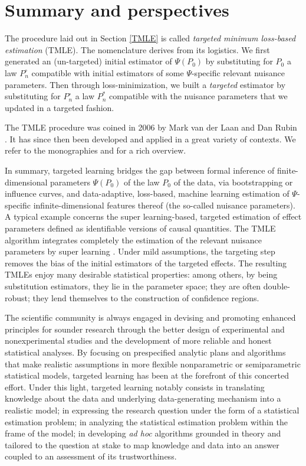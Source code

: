 \documentclass[
  11pt,
  openright,twoside]{book}
\newcommand{\Phat}{P^{\circ}}
\theoremstyle{definition}
\theoremstyle{definition}
\theoremstyle{definition}
\theoremstyle{definition}
\theoremstyle{remark}
\begin{document}
\hypertarget{summary-and-perspectives}{%
\section{Summary and perspectives}\label{summary-and-perspectives}}

The procedure laid out in Section \ref{TMLE} is called \emph{targeted minimum
loss-based estimation} (TMLE). The nomenclature derives from its logistics.
We first generated an (un-targeted) initial estimator of \(\Psi(P_0)\) by
substituting for \(P_{0}\) a law \(\Phat_{n}\) compatible with initial estimators
of some \(\Psi\)-specific relevant nuisance parameters. Then through
loss-minimization, we built a \emph{targeted} estimator by substituting for
\(\Phat_{n}\) a law \(P_{n}^{*}\) compatible with the nuisance parameters that we
updated in a targeted fashion.

The TMLE procedure was coined in 2006 by Mark van der Laan and Dan Rubin
\citep{TMLE06}. It has since then been developed and applied in a great variety of
contexts. We refer to the monographies \citep{TMLEbook11} and \citep{TMLEbook18} for a
rich overview.

In summary, targeted learning bridges the gap between formal inference of
finite-dimensional parameters \(\Psi(P_{0})\) of the law \(P_{0}\) of the data,
via bootstrapping or influence curves, and data-adaptive, loss-based, machine
learning estimation of \(\Psi\)-specific infinite-dimensional features thereof
(the so-called nuisance parameters). A typical example concerns the super
learning-based, targeted estimation of effect parameters defined as
identifiable versions of causal quantities. The TMLE algorithm integrates
completely the estimation of the relevant nuisance parameters by super
learning \citep{SL07}. Under mild assumptions, the targeting step removes the bias
of the initial estimators of the targeted effects. The resulting TMLEs enjoy
many desirable statistical properties: among others, by being substitution
estimators, they lie in the parameter space; they are often double-robust;
they lend themselves to the construction of confidence regions.

The scientific community is always engaged in devising and promoting enhanced
principles for sounder research through the better design of experimental and
nonexperimental studies and the development of more reliable and honest
statistical analyses. By focusing on prespecified analytic plans and
algorithms that make realistic assumptions in more flexible nonparametric or
semiparametric statistical models, targeted learning has been at the forefront of
this concerted effort. Under this light, targeted learning notably consists in
translating knowledge about the data and underlying data-generating mechanism
into a realistic model; in expressing the research question under the form of
a statistical estimation problem; in analyzing the statistical estimation
problem within the frame of the model; in developing \emph{ad hoc} algorithms
grounded in theory and tailored to the question at stake to map knowledge and
data into an answer coupled to an assessment of its trustworthiness.
\end{document}
